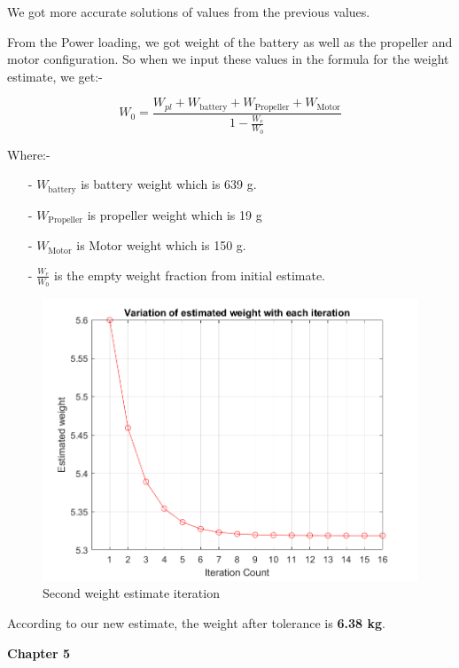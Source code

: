 \documentclass[12 pt]{article}
\begin{document}
We got more accurate solutions of values from the previous values. 

From the Power loading, we got weight of the battery as well as the propeller and motor configuration. So when we input these values in the formula for the weight estimate, we get:- 

$$W_{0} = \frac{W_{pl}  +  W_{\text{battery}}+  W_{\text{Propeller}} + W_{\text{Motor}}}{1 - \frac{W_{e}}{W_{0}}}$$

Where:-
\begin{itemize}
    \item[-] $W_{\text{battery}}$ is battery weight which is 639 g.
    \item[-] $W_{\text{Propeller}}$ is propeller weight which is 19 g
    \item[-] $W_{\text{Motor}}$ is Motor weight which is 150 g.
    \item[-] $\frac{W_{e}}{W_{0}}$ is the empty weight fraction from initial estimate.
\end{itemize}

\begin{figure}[h]
    \centering
    \includegraphics[width=1.0\linewidth]{Codes//Week 2/weight_2.png}
    \caption{Second weight estimate iteration}
    \label{Second weight estimate iteration}
\end{figure}
\vspace{50cm}
 According to our new estimate, the weight after tolerance is \textbf{6.38 kg}.

\afterpage{\clearpage}
\newpage

\textbf{\Huge{Chapter 5}}
\end{document}
